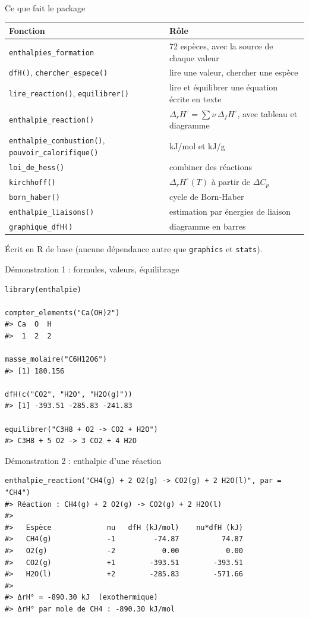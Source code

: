 \documentclass[aspectratio=169,10pt]{beamer}
\newcommand{\dfH}{\Delta_{f}H^{\circ}}
\newcommand{\drH}{\Delta_{r}H^{\circ}}
\begin{document}
\begin{frame}{Ce que fait le package}
  \small
  \begin{tabular}{@{}p{}p{}@{}}
    \toprule
    Fonction & Rôle\\
    \midrule
    \texttt{enthalpies\_formation} & 72 espèces, avec la source de chaque valeur\\
    \texttt{dfH()}, \texttt{chercher\_espece()} & lire une valeur, chercher une espèce\\
    \texttt{lire\_reaction()}, \texttt{equilibrer()} & lire et équilibrer une équation écrite en texte\\
    \texttt{enthalpie\_reaction()} & $\drH = \sum \nu\,\dfH$, avec tableau et diagramme\\
    \texttt{enthalpie\_combustion()}, \texttt{pouvoir\_calorifique()} & kJ/mol et kJ/g\\
    \texttt{loi\_de\_hess()} & combiner des réactions\\
    \texttt{kirchhoff()} & $\drH(T)$ à partir de $\Delta C_p$\\
    \texttt{born\_haber()} & cycle de Born-Haber\\
    \texttt{enthalpie\_liaisons()} & estimation par énergies de liaison\\
    \texttt{graphique\_dfH()} & diagramme en barres\\
    \bottomrule
  \end{tabular}
  \vspace{2mm}

  {\footnotesize Écrit en R de base (aucune dépendance autre que \texttt{graphics} et \texttt{stats}).}
\end{frame}

\begin{frame}[fragile]{Démonstration 1 : formules, valeurs, équilibrage}
\begin{Verbatim}[fontsize=\small]
library(enthalpie)

compter_elements("Ca(OH)2")
#> Ca  O  H
#>  1  2  2

masse_molaire("C6H12O6")
#> [1] 180.156

dfH(c("CO2", "H2O", "H2O(g)"))
#> [1] -393.51 -285.83 -241.83

equilibrer("C3H8 + O2 -> CO2 + H2O")
#> C3H8 + 5 O2 -> 3 CO2 + 4 H2O
\end{Verbatim}
\end{frame}

\begin{frame}[fragile]{Démonstration 2 : enthalpie d'une réaction}
\begin{Verbatim}[fontsize=\footnotesize]
enthalpie_reaction("CH4(g) + 2 O2(g) -> CO2(g) + 2 H2O(l)", par = "CH4")
#> Réaction : CH4(g) + 2 O2(g) -> CO2(g) + 2 H2O(l)
#>
#>   Espèce             nu   dfH (kJ/mol)    nu*dfH (kJ)
#>   CH4(g)             -1         -74.87          74.87
#>   O2(g)              -2           0.00           0.00
#>   CO2(g)             +1        -393.51        -393.51
#>   H2O(l)             +2        -285.83        -571.66
#>
#> ΔrH° = -890.30 kJ  (exothermique)
#> ΔrH° par mole de CH4 : -890.30 kJ/mol
\end{Verbatim}
\end{frame}
\end{document}
